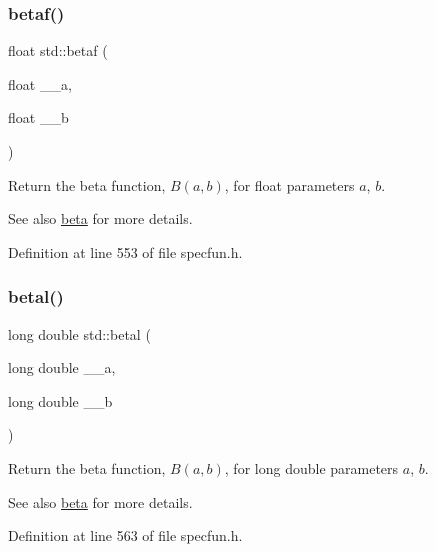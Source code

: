 \subsubsection{\texorpdfstring{betaf()}{betaf()}}
{\footnotesize\ttfamily float std\+::betaf (\begin{DoxyParamCaption}\item[{float}]{\+\_\+\+\_\+a,  }\item[{float}]{\+\_\+\+\_\+b }\end{DoxyParamCaption})\hspace{0.3cm}{\ttfamily [inline]}}

Return the beta function, $ B(a,b) $, for {\ttfamily float} parameters $ a $, $ b $.

\begin{DoxySeeAlso}{See also}
\hyperlink{group__cxx17__math__spec__func_gacd36403ae64b89840b1504f97024dcee}{beta} for more details. 
\end{DoxySeeAlso}


Definition at line 553 of file specfun.\+h.

\mbox{\label{group__cxx17__math__spec__func_ga8caca1cef099f41a88111209c36ce06c}} 
\subsubsection{\texorpdfstring{betal()}{betal()}}
{\footnotesize\ttfamily long double std\+::betal (\begin{DoxyParamCaption}\item[{long double}]{\+\_\+\+\_\+a,  }\item[{long double}]{\+\_\+\+\_\+b }\end{DoxyParamCaption})\hspace{0.3cm}{\ttfamily [inline]}}

Return the beta function, $B(a,b)$, for long double parameters $ a $, $ b $.

\begin{DoxySeeAlso}{See also}
\hyperlink{group__cxx17__math__spec__func_gacd36403ae64b89840b1504f97024dcee}{beta} for more details. 
\end{DoxySeeAlso}


Definition at line 563 of file specfun.\+h.

